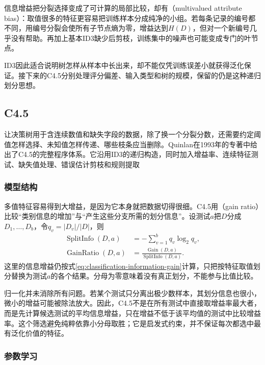 信息增益把分裂选择变成了可计算的局部比较，却有（multivalued attribute bias）：取值很多的特征更容易把训练样本分成纯净的小组。若每条记录的编号都不同，用编号分裂会使所有子节点熵为零，增益达到$H(D)$，但对一个新编号几乎没有帮助。再加上基本ID3缺少后剪枝，训练集中的噪声也可能变成专门的叶节点。

ID3因此适合说明树怎样从样本中长出来，却不能仅凭训练误差小就获得泛化保证。接下来的C4.5分别处理评分偏差、输入类型和树的规模，保留的仍是这种递归划分思想。

\subsection{C4.5}
\label{sec:classification-c45}

让决策树用于含连续数值和缺失字段的数据，除了换一个分裂分数，还需要约定阈值怎样选择、未知值怎样传递、哪些枝条应当删除。Quinlan在1993年的专著中给出了C4.5的完整程序体系。它沿用ID3的递归构造，同时加入增益率、连续特征测试、缺失值处理、错误估计剪枝和规则提取

\subsubsection{模型结构}
\label{sec:classification-c45-structure}

多值特征容易得到大增益，是因为它本身就把数据切得很细。C4.5用（gain ratio）比较“类别信息的增加”与“产生这些分支所需的划分信息”。设测试$a$把$D$分成$D_1,\ldots,D_b$，令$q_v=|D_v|/|D|$，则
\begin{align}
  \operatorname{SplitInfo}(D,a)
  &=-\sum_{v=1}^{b}q_v\log_2 q_v,
  \label{eq:classification-split-information}\\
  \operatorname{GainRatio}(D,a)
  &=\frac{\operatorname{Gain}(D,a)}
  {\operatorname{SplitInfo}(D,a)}.
  \label{eq:classification-gain-ratio}
\end{align}
这里的信息增益仍按式\eqref{eq:classification-information-gain}计算，只把按特征取值划分替换为测试$a$的各个结果。分母为零意味着没有真正划分，不能参与比值比较。

归一化并未消除所有问题。若某个测试只分离出极少数样本，其划分信息也很小，微小的增益可能被除法放大。因此，C4.5不是在所有测试中直接取增益率最大者，而是先计算候选测试的平均信息增益，只在增益不低于该平均值的测试中比较增益率。这个筛选避免纯粹依靠小分母取胜；它是启发式约束，并不保证每次都选中最有泛化价值的特征。

\subsubsection{参数学习}
\label{sec:classification-c45-learning}

